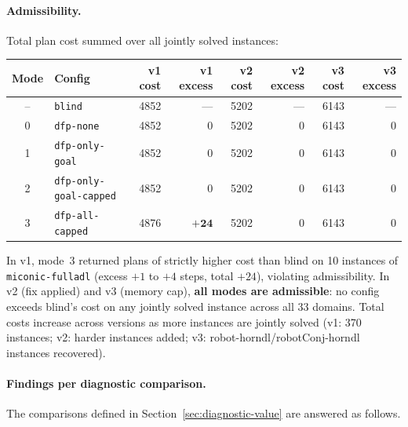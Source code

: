 \documentclass[11pt,a4paper]{article}
\begin{document}
\paragraph{Admissibility.}

Total plan cost summed over all jointly solved instances:

\begin{center}
\small
\begin{tabular}{clrrrrrr}
\toprule
\textbf{Mode} & \textbf{Config} & \textbf{v1 cost} & \textbf{v1 excess} &
  \textbf{v2 cost} & \textbf{v2 excess} & \textbf{v3 cost} & \textbf{v3 excess} \\
\midrule
 --  & \texttt{blind}                & 4852 & ---            & 5202 & ---  & 6143 & --- \\
  0  & \texttt{dfp-none}             & 4852 & $0$            & 5202 & $0$  & 6143 & $0$ \\
  1  & \texttt{dfp-only-goal}        & 4852 & $0$            & 5202 & $0$  & 6143 & $0$ \\
  2  & \texttt{dfp-only-goal-capped} & 4852 & $0$            & 5202 & $0$  & 6143 & $0$ \\
  3  & \texttt{dfp-all-capped}       & 4876 & $\mathbf{+24}$ & 5202 & $0$  & 6143 & $0$ \\
\bottomrule
\end{tabular}
\end{center}

In v1, mode~3 returned plans of strictly higher cost than blind on
10 instances of \texttt{miconic-fulladl} (excess $+1$ to $+4$ steps,
total $+24$), violating admissibility.
In v2 (fix applied) and v3 (memory cap), \textbf{all modes are admissible}:
no config exceeds blind's cost on any jointly solved instance across all
33 domains.  Total costs increase across versions as more instances are jointly
solved (v1: 370 instances; v2: harder instances added; v3: robot-horndl/robotConj-horndl
instances recovered).

\paragraph{Findings per diagnostic comparison.}

The comparisons defined in Section~\ref{sec:diagnostic-value} are answered
as follows.
\end{document}
